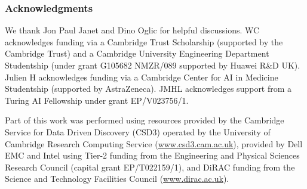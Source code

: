 \documentclass[10pt]{article} %
\theoremstyle{plain}
\theoremstyle{definition}
\begin{document}
\subsubsection*{Acknowledgments}
We thank Jon Paul Janet and Dino Oglic for helpful discussions. WC acknowledges funding via a Cambridge Trust Scholarship (supported by the Cambridge Trust) and a Cambridge University Engineering Department Studentship (under grant G105682 NMZR/089 supported by Huawei R\&D UK). Julien H acknowledges funding via a Cambridge Center for AI in Medicine Studentship (supported by AstraZeneca). JMHL acknowledges support from a Turing AI Fellowship under grant EP/V023756/1.

Part of this work was performed using resources provided by the Cambridge Service for Data Driven Discovery (CSD3) operated by the University of Cambridge Research Computing Service (\url{www.csd3.cam.ac.uk}), provided by Dell EMC and Intel using Tier-2 funding from the Engineering and Physical Sciences Research Council (capital grant EP/T022159/1), and DiRAC funding from the Science and Technology Facilities Council (\url{www.dirac.ac.uk}).




\clearpage
\appendix
\end{document}
